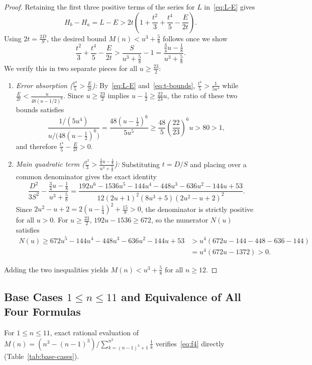 \documentclass[11pt,a4paper]{article}
\theoremstyle{remark}
\begin{document}
\begin{proof}
Retaining the first three positive terms of the series for $L$ in~\eqref{eq:L-E} gives
\[
  H_b - H_a = L - E > 2t\!\left(1 + \frac{t^2}{3} + \frac{t^4}{5} - \frac{E}{2t}\right).
\]
Using $2t = \frac{2D}{S}$, the desired bound $M(n) < u^3 + \frac{5}{8}$ follows once we show
\[
  \frac{t^2}{3} + \frac{t^4}{5} - \frac{E}{2t} > \frac{S}{u^3 + \frac{5}{8}} - 1 = \frac{\frac{3}{4}u - \frac{1}{8}}{u^3 + \frac{5}{8}}.
\]
We verify this in two separate pieces for all $u \ge \frac{23}{2}$:
\begin{enumerate}
  \item \emph{Error absorption ($\frac{t^4}{5} > \frac{E}{2t}$):} By~\eqref{eq:L-E} and~\eqref{eq:t-bounds}, $\frac{t^4}{5} > \frac{1}{5u^4}$ while $\frac{E}{2t} < \frac{u}{48(u - 1/2)^6}$. Since $u \ge \frac{23}{2}$ implies $u - \frac{1}{2} \ge \frac{22}{23}u$, the ratio of these two bounds satisfies
  \[
    \frac{1/(5u^4)}{u/\big(48(u - \frac{1}{2})^6\big)} = \frac{48(u - \frac{1}{2})^6}{5u^5} \ge \frac{48}{5}\left(\frac{22}{23}\right)^6 u > 80 > 1,
  \]
  and therefore $\frac{t^4}{5} - \frac{E}{2t} > 0$.
  \item \emph{Main quadratic term ($\frac{t^2}{3} > \frac{\frac{3}{4}u - \frac{1}{8}}{u^3 + \frac{5}{8}}$):} Substituting $t = D/S$ and placing over a common denominator gives the exact identity
  \[
    \frac{D^2}{3S^2} - \frac{\frac{3}{4}u - \frac{1}{8}}{u^3 + \frac{5}{8}} = \frac{192u^6 - 1536u^5 - 144u^4 - 448u^3 - 636u^2 - 144u + 53}{12(2u+1)^2(8u^3+5)(2u^2-u+2)^2}.
  \]
  Since $2u^2 - u + 2 = 2(u - \frac{1}{4})^2 + \frac{15}{8} > 0$, the denominator is strictly positive for all $u > 0$. For $u \ge \frac{23}{2}$, $192u - 1536 \ge 672$, so the numerator $N(u)$ satisfies
  \begin{align*}
    N(u) \ge 672u^5 - 144u^4 - 448u^3 - 636u^2 - 144u + 53 &> u^4(672u - 144 - 448 - 636 - 144) \\
    &= u^4(672u - 1372) > 0.
  \end{align*}
\end{enumerate}
Adding the two inequalities yields $M(n) < u^3 + \frac{5}{8}$ for all $n \ge 12$.
\end{proof}

\subsection{Base Cases $1 \le n \le 11$ and Equivalence of All Four Formulas}

For $1 \le n \le 11$, exact rational evaluation of $M(n) = (n^3 - (n-1)^3) / \sum_{k=(n-1)^3+1}^{n^3} \frac{1}{k}$ verifies~\eqref{eq:f4} directly (Table~\ref{tab:base-cases}).
\end{document}

